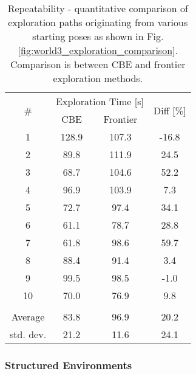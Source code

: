 \documentclass[shortAfour,sageh,times]{sagej_no_sage}
\begin{document}
\begin{table}[]
	\centering
	\caption{Repeatability -  quantitative comparison of exploration paths originating from various starting poses as shown in Fig. \ref{fig:world3_exploration_comparison}. Comparison is between CBE and frontier \citep{Yamauchi1997} exploration methods.}
	\label{tab:World3_comparison}
	\begin{tabular}{|c|c|c|c|}
		\hline
		\multirow{2}{*}{\#} & \multicolumn{2}{c|}{Exploration Time {[}s{]}} & \multirow{2}{*}{Diff {[}\%{]}} \\
	   \cline{2-3} 
		& CBE                 & Frontier               &               \\
		\hline
		1                   & 128.9               & 107.3                  & -16.8         \\
		\hline
		2                   & 89.8                & 111.9                  & 24.5          \\
		\hline
		3                   & 68.7                & 104.6                  & 52.2          \\
		\hline
		4                   & 96.9                & 103.9                  & 7.3           \\
		\hline
		5                   & 72.7                & 97.4                   & 34.1          \\
		\hline
		6                   & 61.1                & 78.7                   & 28.8          \\
		\hline
		7                   & 61.8                & 98.6                   & 59.7          \\
		\hline
		8                   & 88.4                & 91.4                   & 3.4           \\
		\hline
		9                   & 99.5                & 98.5                   & -1.0          \\
		\hline
		10                  & 70.0                & 76.9                   & 9.8           \\
		\hline
		\multicolumn{4}{|c|}{ } \\
		\hline
		Average             & 83.8                & 96.9                   & 20.2
		\\
		\hline
		std. dev.             & 21.2                & 11.6                   & 24.1
		\\
		\hline             
	\end{tabular}
\end{table}
  		
  
\subsubsection{Structured Environments} 	\hfill \break
\end{document}
